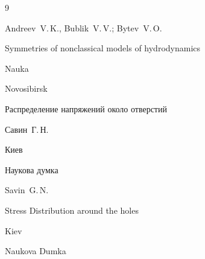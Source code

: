 \begin{thebibliography}{9}

\misctransl

\by Andreev~V.\,K., Bublik~V.\,V.; Bytev~V.\,O. 

\book Symmetries of nonclassical models of hydrodynamics

\publ Nauka

\publaddr Novosibirsk






\book Распределение напряжений около отверстий

\by Савин~Г.\,Н.

\publaddr Киев

\publ Наукова думка



\misctransl

\by Savin~G.\,N.

\book Stress Distribution around the holes

\publaddr Kiev

\publ Naukova Dumka





\end{thebibliography}



\noindent

\hskip6.5cm \thedate \par\noindent

\hskip6.5cm\therevdate\par









\makeengtitlem



\newpage



%


